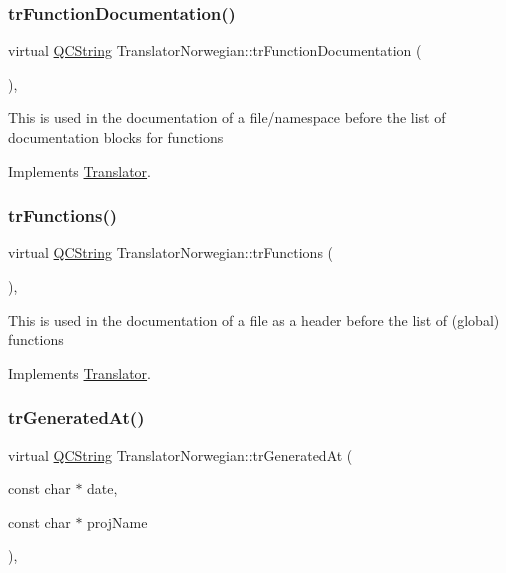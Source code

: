 \subsubsection{\texorpdfstring{trFunctionDocumentation()}{trFunctionDocumentation()}}
{\footnotesize\ttfamily virtual \mbox{\hyperlink{class_q_c_string}{Q\+C\+String}} Translator\+Norwegian\+::tr\+Function\+Documentation (\begin{DoxyParamCaption}{ }\end{DoxyParamCaption})\hspace{0.3cm}{\ttfamily [inline]}, {\ttfamily [virtual]}}

This is used in the documentation of a file/namespace before the list of documentation blocks for functions 

Implements \mbox{\hyperlink{class_translator}{Translator}}.

\mbox{\label{class_translator_norwegian_ae28c16bf5b7efce585aeb78167c7e36a}} 
\subsubsection{\texorpdfstring{trFunctions()}{trFunctions()}}
{\footnotesize\ttfamily virtual \mbox{\hyperlink{class_q_c_string}{Q\+C\+String}} Translator\+Norwegian\+::tr\+Functions (\begin{DoxyParamCaption}{ }\end{DoxyParamCaption})\hspace{0.3cm}{\ttfamily [inline]}, {\ttfamily [virtual]}}

This is used in the documentation of a file as a header before the list of (global) functions 

Implements \mbox{\hyperlink{class_translator}{Translator}}.

\mbox{\label{class_translator_norwegian_adf8ef23ac98bd9415011c87683878ade}} 
\subsubsection{\texorpdfstring{trGeneratedAt()}{trGeneratedAt()}}
{\footnotesize\ttfamily virtual \mbox{\hyperlink{class_q_c_string}{Q\+C\+String}} Translator\+Norwegian\+::tr\+Generated\+At (\begin{DoxyParamCaption}\item[{const char $\ast$}]{date,  }\item[{const char $\ast$}]{proj\+Name }\end{DoxyParamCaption})\hspace{0.3cm}{\ttfamily [inline]}, {\ttfamily [virtual]}}

